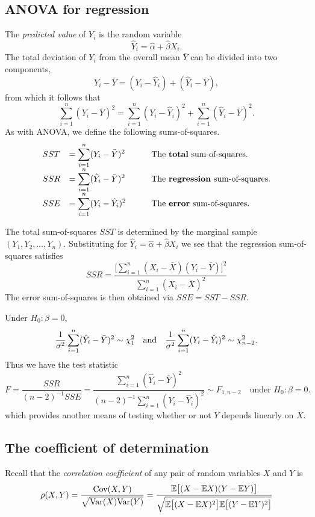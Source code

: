 \subsection{ANOVA for regression}

The \emph{predicted value} of $Y_i$ is the random variable
\[
\hat{Y}_i = \hat{\alpha} + \hat{\beta}X_i.
\]
The total deviation of $Y_i$ from the overall mean $\bar{Y}$ can be divided into two components,
\[
Y_i - \bar{Y} = (Y_i-\hat{Y}_i) + (\hat{Y}_i - \bar{Y}),
\]
from which it follows that
\[
\sum_{i=1}^n(Y_i - \bar{Y})^2 = \sum_{i=1}^n(Y_i-\hat{Y}_i)^2 + \sum_{i=1}^n(\hat{Y}_i - \bar{Y})^2.
\]
As with ANOVA, we define the following sums-of-squares.
\[
\begin{array}{lll}
SST	& = \displaystyle\sum_{i=1}^n (Y_i-\bar{Y})^2
\qquad & \text{The \emph{total} sum-of-squares.} \\
SSR	& = \displaystyle\sum_{i=1}^n (\hat{Y}_i-\bar{Y})^2
\qquad & \text{The \emph{regression} sum-of-squares.} \\
SSE	& = \displaystyle\sum_{i=1}^n (Y_i-\hat{Y}_i)^2
\qquad & \text{The \emph{error} sum-of-squares.} 
\end{array}
\]

The total sum-of-squares $SST$ is determined by the marginal sample $(Y_1,Y_2,\ldots,Y_n)$. Substituting for $\hat{Y}_i = \hat{\alpha} + \hat{\beta}X_i$ we see that the regression sum-of-squares satisfies
\[
SSR = \frac{\big[\sum_{i=1}^n (X_i-\bar{X})(Y_i-\bar{Y})\big]^2}{\sum_{i=1}^n (X_i-\bar{X})^2}
\]
The error sum-of-squares is then obtained via $SSE = SST - SSR$.

\bigskip
Under $H_0:\beta=0$,
\[
\frac{1}{\sigma^2}\sum_{i=1}^n (\hat{Y}_i-\bar{Y})^2	\sim \chi^2_1
\text{\quad and\quad}
\frac{1}{\sigma^2}\sum_{i=1}^n (Y_i-\hat{Y}_i)^2		\sim \chi^2_{n-2}.
\]
Thus we have the test statistic
\[
F 
	= \frac{SSR}{(n-2)^{-1}SSE} 
	= \frac{\sum_{i=1}^n (\hat{Y}_i-\bar{Y})^2}{(n-2)^{-1}\sum_{i=1}^n (Y_i-\hat{Y}_i)^2} 
	\sim F_{1,n-2} \quad\text{under $H_0:\beta=0$.}
\]
which provides another means of testing whether or not $Y$ depends linearly on $X$.


\subsection{The coefficient of determination}

Recall that the \emph{correlation coefficient} of any pair of random variables $X$ and $Y$ is
\[
\rho(X,Y) 
	= \frac{\cov(X,Y)}{\sqrt{\var(X)\var(Y)}}
	= \frac{\expe\big[(X-\expe X)(Y-\expe Y)\big]}
			{\sqrt{\expe\big[(X-\expe X)^2\big]\expe\big[(Y-\expe Y)^2\big]}}
\]

